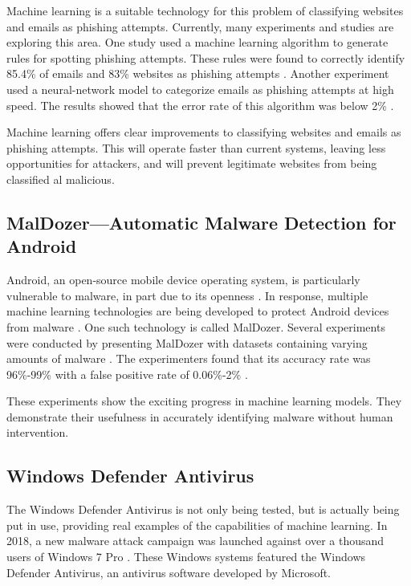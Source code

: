 Machine learning is a suitable technology for this problem of classifying websites and emails as phishing attempts.
Currently, many experiments and studies are exploring this area.
One study used a machine learning algorithm to generate rules for spotting phishing attempts.
These rules were found to correctly identify 85.4\% of emails and 83\% websites as phishing attempts \cite{anti_phishing_techniques}.
Another experiment used a neural-network model to categorize emails as phishing attempts at high speed.
The results showed that the error rate of this algorithm was below 2\% \cite{anti_phishing_techniques}.

Machine learning offers clear improvements to classifying websites and emails as phishing attempts.
This will operate faster than current systems, leaving less opportunities for attackers, and will prevent legitimate websites from being classified al malicious.

\subsection{MalDozer---Automatic Malware Detection for Android}
Android, an open-source mobile device operating system, is particularly vulnerable to malware, in part due to its openness \cite{sustainablecities2021}.
In response, multiple machine learning technologies are being developed to protect Android devices from malware \cite{sustainablecities2021}.
One such technology is called MalDozer.
Several experiments were conducted by presenting MalDozer with datasets containing varying amounts of malware \cite{sustainablecities2021}.
The experimenters found that its accuracy rate was 96\%-99\% with a false positive rate of 0.06\%-2\% \cite{sustainablecities2021}.

These experiments show the exciting progress in machine learning models.
They demonstrate their usefulness in accurately identifying malware without human intervention.

\subsection{Windows Defender Antivirus}
The Windows Defender Antivirus is not only being tested, but is actually being put in use, providing real examples of the capabilities of machine learning.
In 2018, a new malware attack campaign was launched against over a thousand users of Windows 7 Pro \cite{microsoft2018}.
These Windows systems featured the Windows Defender Antivirus, an antivirus software developed by Microsoft.

